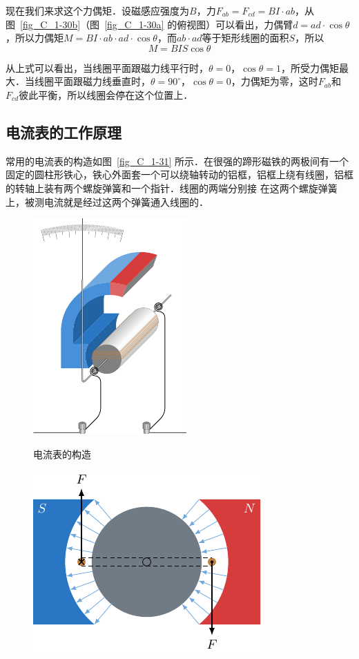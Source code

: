 现在我们来求这个力偶矩．设磁感应强度为$B$，力$F_{ab}=
F_{cd}=BI·ab$，从图~\ref{fig_C_1-30b}（图~\ref{fig_C_1-30a} 的俯视图）可以看出，力偶臂$d=ad\cdot \cos\theta$，所以力偶矩$M=BI\cdot ab\cdot ad\cdot \cos\theta$，而$ab\cdot ad$等于矩形线圈的面积$S$，所以$$M=BIS\cos\theta$$

从上式可以看出，当线圈平面跟磁力线平行时，$\theta=0$，$\cos\theta=1$，所受力偶矩最大．当线圈平面跟磁力线垂直时，$\theta=90^{\circ}$，$\cos\theta=0$，力偶矩为零，这时$F_{ab}$和$F_{cd}$彼此平衡，所以线圈会停在这个位置上．

\subsection{电流表的工作原理}

常用的电流表的构造如图~\ref{fig_C_1-31} 所示．在很强的蹄形磁铁的两极间有一个固定的圆柱形铁心，铁心外面套一个可以绕轴转动的铝框，铝框上绕有线圈，铝框的转轴上装有两个螺旋弹簧和一个指针．线圈的两端分别接
在这两个螺旋弹簧上，被测电流就是经过这两个弹簧通入线圈的．
\begin{figure}[htbp]
    \centering
    \begin{minipage}[t]{0.48\textwidth}
        \centering
        \includegraphics{fig/C/1-31.pdf}
        \caption{电流表的构造}\label{fig_C_1-31}
    \end{minipage}
    \begin{minipage}[t]{0.48\textwidth}
        \centering
        \includegraphics{fig/C/1-32.pdf}
        \caption{}\label{fig_C_1-32}
    \end{minipage}
\end{figure}


